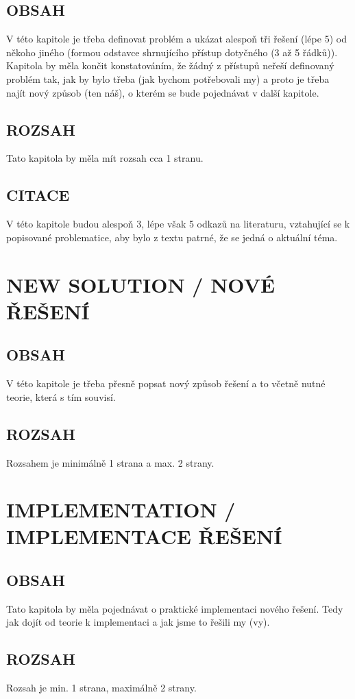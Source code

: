 \documentclass[journal]{IEEEtran}
\begin{document}
\subsection{OBSAH}
V této kapitole je třeba definovat problém a ukázat alespoň tři řešení (lépe 5) od někoho jiného (formou odstavce shrnujícího přístup dotyčného (3 až 5 řádků)). Kapitola by měla končit konstatováním, že žádný z přístupů neřeší definovaný problém tak, jak by bylo třeba (jak bychom potřebovali my) a proto je třeba najít nový způsob (ten náš), o kterém se bude pojednávat v další kapitole.
\subsection{ROZSAH}
Tato kapitola by měla mít rozsah cca 1 stranu.
\subsection{CITACE}
V této kapitole budou alespoň 3, lépe však 5 odkazů na literaturu, vztahující se k popisované problematice, aby bylo z textu patrné, že se jedná o aktuální téma.




\section{NEW SOLUTION / NOVÉ ŘEŠENÍ}

\subsection{OBSAH}
V této kapitole je třeba přesně popsat nový způsob řešení a to včetně nutné teorie, která s tím souvisí. 
\subsection{ROZSAH}
Rozsahem je minimálně 1 strana a max. 2 strany.




\section{IMPLEMENTATION / IMPLEMENTACE ŘEŠENÍ}
\subsection{OBSAH}
Tato kapitola by měla pojednávat o praktické implementaci nového řešení. Tedy jak dojít od teorie k implementaci a jak jsme to řešili my (vy).
\subsection{ROZSAH}
Rozsah je min. 1 strana, maximálně 2 strany.
\end{document}
